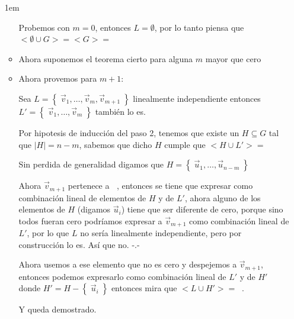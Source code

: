 \documentclass[12pt, fleqn]{report}                             %
\newenvironment{SmallIndentation}[1][0.75em]                    %
        {\begin{adjustwidth}{#1}{}\begin{footnotesize}}             %
        {\end{footnotesize}\end{adjustwidth}}                       %
\theoremstyle{break}                                            %
\DeclareMathOperator \GenericField {\mathbb{F}}                 %
\DeclareMathOperator \VectorSet    {\mathbb{V}}                 %
\DeclareMathOperator \VectorSpace  {\VectorSet_{\GenericField}} %
\newcommand{\Set}[1]    {\left\{ \; #1 \; \right\}}             %
\begin{document}
\begin{itemize}
\begin{SmallIndentation}[1em]
\begin{itemize}
                                    Probemos con $m = 0$, entonces $L = \emptyset$, por lo tanto piensa que
                                    $<\emptyset \cup G> = <G> = \VectorSpace$

                                \item
                                    Ahora suponemos el teorema cierto para alguna $m$ mayor que cero

                                \item
                                    Ahora provemos para $m+1$:

                                    Sea $L = \Set{\vec v_1, \dots, \vec v_m, \vec v_{m+1}}$ linealmente independiente
                                    entonces $L' = \Set{\vec v_1, \dots, \vec v_m}$ también lo es.

                                    Por hipotesis de inducción del paso 2, tenemos que existe un $H \subseteq G$
                                    tal que $|H| = n - m$, sabemos que dicho $H$ cumple que $<H \cup L'> = \VectorSpace$

                                    Sin perdida de generalidad digamos que $H = \Set{\vec u_1, \dots, \vec u_{n-m}}$

                                    Ahora $\vec v_{m+1}$ pertenece a $\VectorSpace$, entonces se tiene que expresar
                                    como combinación lineal de elementos de $H$ y de $L'$, ahora alguno de los
                                    elementos de $H$ (digamos $\vec u_i$) tiene que ser diferente de cero, porque
                                    sino todos fueran cero
                                    podríamos expresar a $\vec v_{m+1}$ como combinación lineal de $L'$, por lo que 
                                    $L$ no sería linealmente independiente, pero por construcción lo es.
                                    Así que no. -.-

                                    Ahora usemos a ese elemento que no es cero y despejemos a $\vec v_{m+1}$, entonces
                                    podemos expresarlo como combinación lineal de $L'$ y de $H'$ donde
                                    $H' = H - \Set{\vec u_i}$ entonces mira que $<L \cup H'> = \VectorSpace$.

                                    Y queda demostrado.
                            \end{itemize}
                        

\end{SmallIndentation}
\end{itemize}
\end{document}
